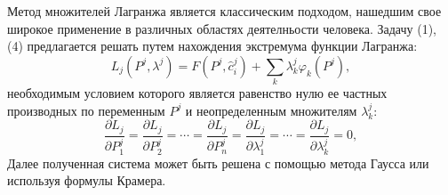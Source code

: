 %

Метод множителей Лагранжа является классическим подходом, нашедшим свое широкое применение в различных областях деятелньости человека. Задачу (1), (4) предлагается решать путем нахождения экстремума функции Лагранжа:
\begin{equation}
 \label{lagr}
 L_j(P^j, \lambda^j) = F(P^j, \hat{c}_i^j) + \sum_k \lambda^j_k \varphi_k(P^j),
\end{equation}
необходимым условием которого является равенство нулю ее частных производных по переменным $P^j$ и неопределенным множителям $\lambda^j_k$:
\[\frac{\partial L_j}{\partial P^j_1} = \frac{\partial L_j}{\partial P^j_2} = \cdots = \frac{\partial L_j}{\partial P^j_n} = \frac{\partial L_j}{\partial \lambda^j_1} = \cdots = \frac{\partial L_j}{\partial \lambda^j_k} = 0,\]
Далее полученная система может быть решена с помощью метода Гаусса или используя формулы Крамера.
